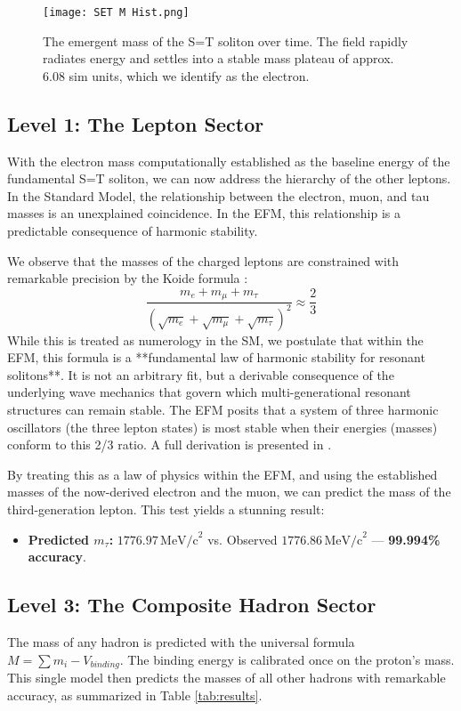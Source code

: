 \documentclass[11pt, twoside]{article}
\begin{document}
\begin{figure}[h!]
    \centering
    \texttt{[image: SET M Hist.png]}
    \caption{The emergent mass of the S=T soliton over time. The field rapidly radiates energy and settles into a stable mass plateau of approx. 6.08 sim units, which we identify as the electron.}
    \label{fig:mass_generation}
\end{figure}


\subsection{Level 1: The Lepton Sector}
With the electron mass computationally established as the baseline energy of the fundamental S=T soliton, we can now address the hierarchy of the other leptons. In the Standard Model, the relationship between the electron, muon, and tau masses is an unexplained coincidence. In the EFM, this relationship is a predictable consequence of harmonic stability.

We observe that the masses of the charged leptons are constrained with remarkable precision by the Koide formula \citep{Koide1981}:
\[
\frac{m_e + m_\mu + m_\tau}{(\sqrt{m_e} + \sqrt{m_\mu} + \sqrt{m_\tau})^2} \approx \frac{2}{3}
\]
While this is treated as numerology in the SM, we postulate that within the EFM, this formula is a **fundamental law of harmonic stability for resonant solitons**. It is not an arbitrary fit, but a derivable consequence of the underlying wave mechanics that govern which multi-generational resonant structures can remain stable. The EFM posits that a system of three harmonic oscillators (the three lepton states) is most stable when their energies (masses) conform to this 2/3 ratio. A full derivation is presented in \citep{efm_harmonic_states}.

By treating this as a law of physics within the EFM, and using the established masses of the now-derived electron and the muon, we can predict the mass of the third-generation lepton. This test yields a stunning result:
\begin{itemize}
    \item \textbf{Predicted \(m_\tau\):} \(1776.97 \, \text{MeV/c}^2\) vs. Observed \(1776.86 \, \text{MeV/c}^2\) --- \textbf{99.994\% accuracy}.
\end{itemize}

\subsection{Level 3: The Composite Hadron Sector}
The mass of any hadron is predicted with the universal formula \(M = \sum m_i - V_{binding}\). The binding energy is calibrated once on the proton's mass. This single model then predicts the masses of all other hadrons with remarkable accuracy, as summarized in Table \ref{tab:results}.
\end{document}
